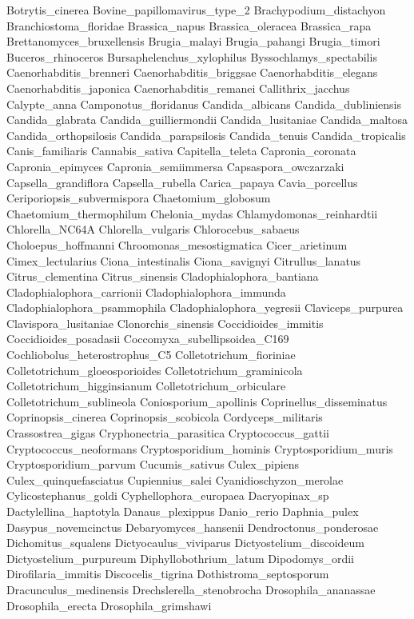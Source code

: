 \documentclass[letterpaper,10pt,english]{sphinxmanual}
\begin{document}
{\begin{sphinxVerbatim}[commandchars=\\\{\}]
Botrytis\_cinerea
Bovine\_papillomavirus\_type\_2
Brachypodium\_distachyon
Branchiostoma\_floridae
Brassica\_napus
Brassica\_oleracea
Brassica\_rapa
Brettanomyces\_bruxellensis
Brugia\_malayi
Brugia\_pahangi
Brugia\_timori
Buceros\_rhinoceros
Bursaphelenchus\_xylophilus
Byssochlamys\_spectabilis
Caenorhabditis\_brenneri
Caenorhabditis\_briggsae
Caenorhabditis\_elegans
Caenorhabditis\_japonica
Caenorhabditis\_remanei
Callithrix\_jacchus
Calypte\_anna
Camponotus\_floridanus
Candida\_albicans
Candida\_dubliniensis
Candida\_glabrata
Candida\_guilliermondii
Candida\_lusitaniae
Candida\_maltosa
Candida\_orthopsilosis
Candida\_parapsilosis
Candida\_tenuis
Candida\_tropicalis
Canis\_familiaris
Cannabis\_sativa
Capitella\_teleta
Capronia\_coronata
Capronia\_epimyces
Capronia\_semiimmersa
Capsaspora\_owczarzaki
Capsella\_grandiflora
Capsella\_rubella
Carica\_papaya
Cavia\_porcellus
Ceriporiopsis\_subvermispora
Chaetomium\_globosum
Chaetomium\_thermophilum
Chelonia\_mydas
Chlamydomonas\_reinhardtii
Chlorella\_NC64A
Chlorella\_vulgaris
Chlorocebus\_sabaeus
Choloepus\_hoffmanni
Chroomonas\_mesostigmatica
Cicer\_arietinum
Cimex\_lectularius
Ciona\_intestinalis
Ciona\_savignyi
Citrullus\_lanatus
Citrus\_clementina
Citrus\_sinensis
Cladophialophora\_bantiana
Cladophialophora\_carrionii
Cladophialophora\_immunda
Cladophialophora\_psammophila
Cladophialophora\_yegresii
Claviceps\_purpurea
Clavispora\_lusitaniae
Clonorchis\_sinensis
Coccidioides\_immitis
Coccidioides\_posadasii
Coccomyxa\_subellipsoidea\_C169
Cochliobolus\_heterostrophus\_C5
Colletotrichum\_fioriniae
Colletotrichum\_gloeosporioides
Colletotrichum\_graminicola
Colletotrichum\_higginsianum
Colletotrichum\_orbiculare
Colletotrichum\_sublineola
Coniosporium\_apollinis
Coprinellus\_disseminatus
Coprinopsis\_cinerea
Coprinopsis\_scobicola
Cordyceps\_militaris
Crassostrea\_gigas
Cryphonectria\_parasitica
Cryptococcus\_gattii
Cryptococcus\_neoformans
Cryptosporidium\_hominis
Cryptosporidium\_muris
Cryptosporidium\_parvum
Cucumis\_sativus
Culex\_pipiens
Culex\_quinquefasciatus
Cupiennius\_salei
Cyanidioschyzon\_merolae
Cylicostephanus\_goldi
Cyphellophora\_europaea
Dacryopinax\_sp
Dactylellina\_haptotyla
Danaus\_plexippus
Danio\_rerio
Daphnia\_pulex
Dasypus\_novemcinctus
Debaryomyces\_hansenii
Dendroctonus\_ponderosae
Dichomitus\_squalens
Dictyocaulus\_viviparus
Dictyostelium\_discoideum
Dictyostelium\_purpureum
Diphyllobothrium\_latum
Dipodomys\_ordii
Dirofilaria\_immitis
Discocelis\_tigrina
Dothistroma\_septosporum
Dracunculus\_medinensis
Drechslerella\_stenobrocha
Drosophila\_ananassae
Drosophila\_erecta
Drosophila\_grimshawi

\end{sphinxVerbatim}}
\end{document}
